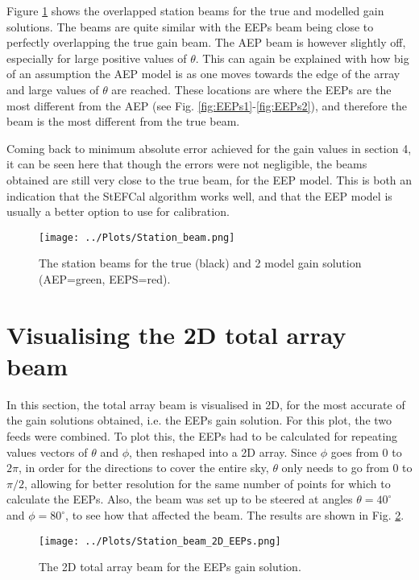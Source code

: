 \documentclass[12pt]{report} %
\begin{document}
Figure \ref{fig:station_beam_AEP} shows the overlapped station beams for the true and modelled gain solutions. The beams are quite similar with the EEPs beam being close to perfectly overlapping the true gain beam. The AEP beam is however slightly off, especially for large positive values of $\theta$. This can again be explained with how big of an assumption the AEP model is as one moves towards the edge of the array and large values of $\theta$ are reached. These locations are where the EEPs are the most different from the AEP (see Fig. \ref{fig:EEPs1}-\ref{fig:EEPs2}), and therefore the beam is the most different from the true beam.

Coming back to minimum absolute error achieved for the gain values in section 4, it can be seen here that though the errors were not negligible, the beams obtained are still very close to the true beam, for the EEP model. This is both an indication that the StEFCal algorithm works well, and that the EEP model is usually a better option to use for calibration.


\begin{figure}[htbp]
  \centering
  \texttt{[image: ../Plots/Station\_beam.png]}
  \caption{The station beams for the true (black) and 2 model gain solution (AEP=green, EEPS=red). }
  \label{fig:station_beam_AEP}
\end{figure}



\section{Visualising the 2D total array beam}

In this section, the total array beam is visualised in 2D, for the most accurate of the gain solutions obtained, i.e. the EEPs gain solution. For this plot, the two feeds were combined. To plot this, the EEPs had to be calculated for repeating values vectors of $\theta$ and $\phi$, then reshaped into a 2D array. Since $\phi$ goes from $0$ to $2\pi$, in order for the directions to cover the entire sky, $\theta$ only needs to go from $0$ to $\pi/2$, allowing for better resolution for the same number of points for which to calculate the EEPs. Also, the beam was set up to be steered at angles $\theta = 40^{\circ}$ and $\phi = 80^{\circ}$, to see how that affected the beam. The results are shown in Fig. \ref{fig:2D_beam_EEP}.
\begin{figure}[h]
    \centering
    \texttt{[image: ../Plots/Station\_beam\_2D\_EEPs.png]}
    \caption{The 2D total array beam for the EEPs gain solution.}
    \label{fig:2D_beam_EEP}
\end{figure}
\end{document}
